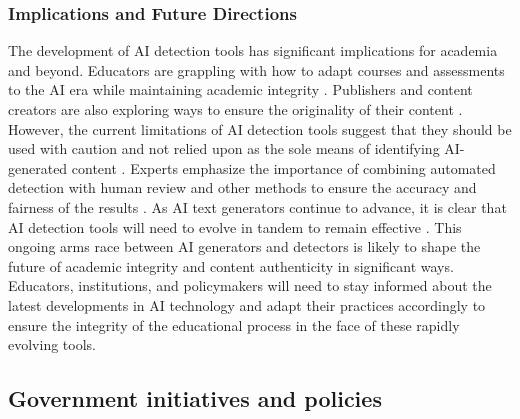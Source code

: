 \documentclass{article}
\begin{document}
\subsubsection{Implications and Future Directions}
The development of AI detection tools has significant implications for academia
and beyond. Educators are grappling with how to adapt courses and assessments
to the AI era while maintaining academic integrity
\cite{https://www.scribbr.com/ai-tools/how-do-ai-detectors-work/}
\cite{https://kb.iu.edu/d/bimt}. Publishers and content creators are
also exploring ways to ensure the originality of their content
\cite{https://www.scribbr.com/ai-tools/how-do-ai-detectors-work/}.
However, the current limitations of AI detection tools suggest that they
should be used with caution and not relied upon as the sole means of
identifying AI-generated content \cite{https://edintegrity.biomedcentral.com/articles/10.1007/s40979-023-00146-z}
\cite{https://edintegrity.biomedcentral.com/articles/10.1007/s40979-023-00140-5}
\cite{https://kb.iu.edu/d/bimt}. Experts emphasize the importance of
combining automated detection with human review and other methods to ensure
the accuracy and fairness of the results \cite{https://edintegrity.biomedcentral.com/articles/10.1007/s40979-023-00146-z}
\cite{https://edintegrity.biomedcentral.com/articles/10.1007/s40979-023-00140-5}.
As AI text generators continue to advance, it is clear that AI detection tools will
need to evolve in tandem to remain effective \cite{https://surferseo.com/blog/how-do-ai-content-detectors-work/}
\cite{https://contadu.com/ai-detection-tools-the-challenge-of-todays-digital-age/}
\cite{https://edintegrity.biomedcentral.com/articles/10.1007/s40979-023-00140-5}.
This ongoing arms race between AI generators and detectors is likely to shape
the future of academic integrity and content authenticity in significant ways.
Educators, institutions, and policymakers will need to stay informed about the
latest developments in AI technology and adapt their practices accordingly to
ensure the integrity of the educational process in the face of these rapidly evolving tools.


\subsection{Government initiatives and policies}
\end{document}
